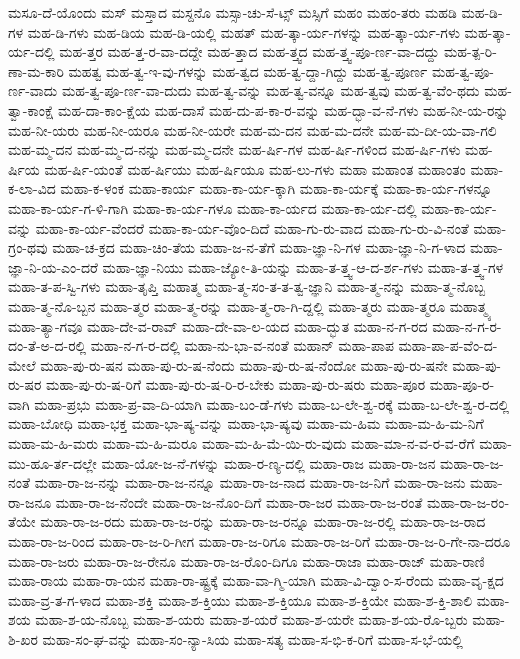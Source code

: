 {ಮಸೂ-ದೆ-ಯೊಂದು
ಮಸ್
ಮಸ್ತಾದ
ಮಸ್ದನೊ
ಮಸ್ಸಾ-ಚು-ಸೆ-ಟ್ಸ್
ಮಸ್ಸಿಗೆ
ಮಹಂ
ಮಹಂ-ತರು
ಮಹಡಿ
ಮಹ-ಡಿ-ಗಳ
ಮಹ-ಡಿ-ಗಳು
ಮಹ-ಡಿಯ
ಮಹ-ಡಿ-ಯಲ್ಲಿ
ಮಹತ್
ಮಹ-ತ್ಕಾ-ರ್ಯ-ಗಳನ್ನು
ಮಹ-ತ್ಕಾ-ರ್ಯ-ಗಳು
ಮಹ-ತ್ಕಾ-ರ್ಯ-ದಲ್ಲಿ
ಮಹ-ತ್ತರ
ಮಹ-ತ್ತ-ರ-ವಾ-ದದ್ದೇ
ಮಹ-ತ್ತಾದ
ಮಹ-ತ್ತ್ವದ
ಮಹ-ತ್ತ್ವ-ಪೂ-ರ್ಣ-ವಾ-ದದ್ದು
ಮಹ-ತ್ಪ-ರಿ-ಣಾ-ಮ-ಕಾರಿ
ಮಹತ್ವ
ಮಹ-ತ್ವ-ಇ-ವು-ಗಳನ್ನು
ಮಹ-ತ್ವದ
ಮಹ-ತ್ವ-ದ್ದಾ-ಗಿದ್ದು
ಮಹ-ತ್ವ-ಪೂರ್ಣ
ಮಹ-ತ್ವ-ಪೂ-ರ್ಣ-ವಾದು
ಮಹ-ತ್ವ-ಪೂ-ರ್ಣ-ವಾ-ದುದು
ಮಹ-ತ್ವ-ವನ್ನು
ಮಹ-ತ್ವ-ವನ್ನೂ
ಮಹ-ತ್ವವು
ಮಹ-ತ್ವ-ವೆಂ-ಥದು
ಮಹ-ತ್ವಾ-ಕಾಂಕ್ಷೆ
ಮಹ-ದಾ-ಕಾಂ-ಕ್ಷೆಯ
ಮಹ-ದಾಸೆ
ಮಹ-ದು-ಪ-ಕಾ-ರ-ವನ್ನು
ಮಹ-ದ್ಭಾ-ವ-ನೆ-ಗಳು
ಮಹ-ನೀ-ಯ-ರನ್ನು
ಮಹ-ನೀ-ಯರು
ಮಹ-ನೀ-ಯರೂ
ಮಹ-ನೀ-ಯರೇ
ಮಹ-ಮ-ದನ
ಮಹ-ಮ-ದನೇ
ಮಹ-ಮ-ದೀ-ಯ-ವಾ-ಗಲಿ
ಮಹ-ಮ್ಮ-ದನ
ಮಹ-ಮ್ಮ-ದ-ನನ್ನು
ಮಹ-ಮ್ಮ-ದನೇ
ಮಹ-ರ್ಷಿ-ಗಳ
ಮಹ-ರ್ಷಿ-ಗಳಿಂದ
ಮಹ-ರ್ಷಿ-ಗಳು
ಮಹ-ರ್ಷಿಯ
ಮಹ-ರ್ಷಿ-ಯಂತೆ
ಮಹ-ರ್ಷಿಯು
ಮಹ-ರ್ಷಿಯೂ
ಮಹ-ಲು-ಗಳು
ಮಹಾ
ಮಹಾಂತ
ಮಹಾಂತಂ
ಮಹಾ-ಕ-ಲಾ-ವಿದ
ಮಹಾ-ಕ-ಳಂಕ
ಮಹಾ-ಕಾರ್ಯ
ಮಹಾ-ಕಾ-ರ್ಯ-ಕ್ಕಾಗಿ
ಮಹಾ-ಕಾ-ರ್ಯಕ್ಕೆ
ಮಹಾ-ಕಾ-ರ್ಯ-ಗಳನ್ನೂ
ಮಹಾ-ಕಾ-ರ್ಯ-ಗ-ಳಿ-ಗಾಗಿ
ಮಹಾ-ಕಾ-ರ್ಯ-ಗಳೂ
ಮಹಾ-ಕಾ-ರ್ಯದ
ಮಹಾ-ಕಾ-ರ್ಯ-ದಲ್ಲಿ
ಮಹಾ-ಕಾ-ರ್ಯ-ವನ್ನು
ಮಹಾ-ಕಾ-ರ್ಯ-ವೆಂದರೆ
ಮಹಾ-ಕಾ-ರ್ಯ-ವೊಂ-ದಿದೆ
ಮಹಾ-ಗು-ರು-ವಾದ
ಮಹಾ-ಗು-ರು-ವಿ-ನಂತೆ
ಮಹಾ-ಗ್ರಂ-ಥವು
ಮಹಾ-ಚ-ಕ್ರದ
ಮಹಾ-ಚಿಂ-ತೆಯ
ಮಹಾ-ಜ-ನ-ತೆಗೆ
ಮಹಾ-ಜ್ಞಾ-ನಿ-ಗಳ
ಮಹಾ-ಜ್ಞಾ-ನಿ-ಗ-ಳಾದ
ಮಹಾ-ಜ್ಞಾ-ನಿ-ಯ-ಎಂ-ದರೆ
ಮಹಾ-ಜ್ಞಾ-ನಿಯು
ಮಹಾ-ಜ್ಯೋ-ತಿ-ಯನ್ನು
ಮಹಾ-ತ-ತ್ತ್ವ-ಆ-ದ-ರ್ಶ-ಗಳು
ಮಹಾ-ತ-ತ್ತ್ವ-ಗಳ
ಮಹಾ-ತ-ಪ-ಸ್ವಿ-ಗಳು
ಮಹಾ-ತೃಪ್ತಿ
ಮಹಾತ್ಮ
ಮಹಾ-ತ್ಮ-ಸಂ-ತ-ತ-ತ್ವ-ಜ್ಞಾನಿ
ಮಹಾ-ತ್ಮ-ನನ್ನು
ಮಹಾ-ತ್ಮ-ನೊಬ್ಬ
ಮಹಾ-ತ್ಮ-ನೊ-ಬ್ಬನ
ಮಹಾ-ತ್ಮರ
ಮಹಾ-ತ್ಮ-ರನ್ನು
ಮಹಾ-ತ್ಮ-ರಾ-ಗಿ-ದ್ದಲ್ಲಿ
ಮಹಾ-ತ್ಮರು
ಮಹಾ-ತ್ಮರೂ
ಮಹಾತ್ಮ್ಯ
ಮಹಾ-ತ್ಯಾ-ಗವೂ
ಮಹಾ-ದೇ-ವ-ರಾವ್
ಮಹಾ-ದೇ-ವಾ-ಲ-ಯದ
ಮಹಾ-ದ್ಭುತ
ಮಹಾ-ನ-ಗ-ರದ
ಮಹಾ-ನ-ಗ-ರ-ದಂ-ತೆ-ಅ-ದ-ರಲ್ಲಿ
ಮಹಾ-ನ-ಗ-ರ-ದಲ್ಲಿ
ಮಹಾ-ನು-ಭಾ-ವ-ನಂತೆ
ಮಹಾನ್
ಮಹಾ-ಪಾಪ
ಮಹಾ-ಪಾ-ಪ-ವೆಂ-ದ-ಮೇಲೆ
ಮಹಾ-ಪು-ರು-ಷನ
ಮಹಾ-ಪು-ರು-ಷ-ನೆಂದು
ಮಹಾ-ಪು-ರು-ಷ-ನೆಂದೋ
ಮಹಾ-ಪು-ರು-ಷನೇ
ಮಹಾ-ಪು-ರು-ಷರ
ಮಹಾ-ಪು-ರು-ಷ-ರಿಗೆ
ಮಹಾ-ಪು-ರು-ಷ-ರಿ-ರ-ಬೇಕು
ಮಹಾ-ಪು-ರು-ಷರು
ಮಹಾ-ಪೂರ
ಮಹಾ-ಪೂ-ರ-ವಾಗಿ
ಮಹಾ-ಪ್ರಭು
ಮಹಾ-ಪ್ರ-ವಾ-ದಿ-ಯಾಗಿ
ಮಹಾ-ಬಂ-ಡೆ-ಗಳು
ಮಹಾ-ಬ-ಲೇ-ಶ್ವ-ರಕ್ಕೆ
ಮಹಾ-ಬ-ಲೇ-ಶ್ವ-ರ-ದಲ್ಲಿ
ಮಹಾ-ಬೋಧಿ
ಮಹಾ-ಭಕ್ತ
ಮಹಾ-ಭಾ-ಷ್ಯ-ವನ್ನು
ಮಹಾ-ಭಾ-ಷ್ಯವು
ಮಹಾ-ಮ-ಹಿಮ
ಮಹಾ-ಮ-ಹಿ-ಮ-ನಿಗೆ
ಮಹಾ-ಮ-ಹಿ-ಮರು
ಮಹಾ-ಮ-ಹಿ-ಮರೂ
ಮಹಾ-ಮ-ಹಿ-ಮೆ-ಯಿ-ರು-ವುದು
ಮಹಾ-ಮಾ-ನ-ವ-ರ-ವ-ರೆಗೆ
ಮಹಾ-ಮು-ಹೂ-ರ್ತ-ದಲ್ಲೇ
ಮಹಾ-ಯೋ-ಜ-ನೆ-ಗಳನ್ನು
ಮಹಾ-ರ-ಣ್ಯ-ದಲ್ಲಿ
ಮಹಾ-ರಾಜ
ಮಹಾ-ರಾ-ಜನ
ಮಹಾ-ರಾ-ಜ-ನಂತೆ
ಮಹಾ-ರಾ-ಜ-ನನ್ನು
ಮಹಾ-ರಾ-ಜ-ನನ್ನೂ
ಮಹಾ-ರಾ-ಜ-ನಾದ
ಮಹಾ-ರಾ-ಜ-ನಿಗೆ
ಮಹಾ-ರಾ-ಜನು
ಮಹಾ-ರಾ-ಜನೂ
ಮಹಾ-ರಾ-ಜ-ನೆಂದೇ
ಮಹಾ-ರಾ-ಜ-ನೊಂ-ದಿಗೆ
ಮಹಾ-ರಾ-ಜರ
ಮಹಾ-ರಾ-ಜ-ರಂತೆ
ಮಹಾ-ರಾ-ಜ-ರಂ-ತೆಯೇ
ಮಹಾ-ರಾ-ಜ-ರದು
ಮಹಾ-ರಾ-ಜ-ರನ್ನು
ಮಹಾ-ರಾ-ಜ-ರನ್ನೂ
ಮಹಾ-ರಾ-ಜ-ರಲ್ಲಿ
ಮಹಾ-ರಾ-ಜ-ರಾದ
ಮಹಾ-ರಾ-ಜ-ರಿಂದ
ಮಹಾ-ರಾ-ಜ-ರಿ-ಗೀಗ
ಮಹಾ-ರಾ-ಜ-ರಿಗೂ
ಮಹಾ-ರಾ-ಜ-ರಿಗೆ
ಮಹಾ-ರಾ-ಜ-ರಿ-ಗೇ-ನಾ-ದರೂ
ಮಹಾ-ರಾ-ಜರು
ಮಹಾ-ರಾ-ಜ-ರೇನೂ
ಮಹಾ-ರಾ-ಜ-ರೊಂ-ದಿಗೂ
ಮಹಾ-ರಾಜಾ
ಮಹಾ-ರಾಜ್
ಮಹಾ-ರಾಣಿ
ಮಹಾ-ರಾಯ
ಮಹಾ-ರಾ-ಯನ
ಮಹಾ-ರಾ-ಷ್ಟ್ರಕ್ಕೆ
ಮಹಾ-ವಾ-ಗ್ಮಿ-ಯಾಗಿ
ಮಹಾ-ವಿ-ದ್ವಾಂ-ಸ-ರೆಂದು
ಮಹಾ-ವೃ-ಕ್ಷದ
ಮಹಾ-ವ್ರ-ತ-ಗ-ಳಾದ
ಮಹಾ-ಶಕ್ತಿ
ಮಹಾ-ಶ-ಕ್ತಿಯು
ಮಹಾ-ಶ-ಕ್ತಿಯೂ
ಮಹಾ-ಶ-ಕ್ತಿಯೇ
ಮಹಾ-ಶ-ಕ್ತಿ-ಶಾಲಿ
ಮಹಾ-ಶಯ
ಮಹಾ-ಶ-ಯ-ನೊಬ್ಬ
ಮಹಾ-ಶ-ಯರು
ಮಹಾ-ಶ-ಯರೆ
ಮಹಾ-ಶ-ಯರೇ
ಮಹಾ-ಶ-ಯ-ರೊ-ಬ್ಬರು
ಮಹಾ-ಶಿ-ಖರ
ಮಹಾ-ಸಂ-ಘ-ವನ್ನು
ಮಹಾ-ಸಂ-ನ್ಯಾ-ಸಿಯ
ಮಹಾ-ಸತ್ಯ
ಮಹಾ-ಸ-ಭಿ-ಕ-ರಿಗೆ
ಮಹಾ-ಸ-ಭೆ-ಯಲ್ಲಿ
}

